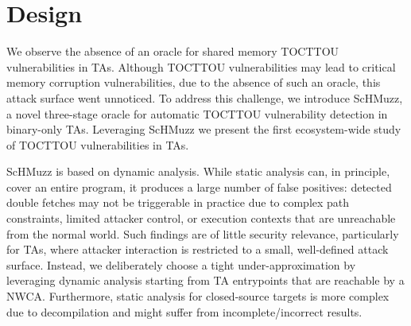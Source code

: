 \documentclass[letterpaper,twocolumn,10pt]{article}
\newcommand{\sysname}{ScHMuzz\xspace}
\begin{document}
\section{Design}\label{sec:design} 



We observe the absence of an oracle for shared memory TOCTTOU vulnerabilities in TAs.
Although TOCTTOU vulnerabilities may lead to critical memory corruption vulnerabilities, due to the 
absence of such an oracle, this attack surface went unnoticed.
To address this challenge, we introduce \sysname, a novel three-stage oracle  
for automatic TOCTTOU vulnerability detection in binary-only TAs. 
Leveraging \sysname we present the first ecosystem-wide study of TOCTTOU vulnerabilities in TAs.

\sysname is based on dynamic analysis. While static analysis 
can, in principle, cover an entire program, it produces a large number of false positives: detected double fetches 
may not be triggerable in practice due to complex path constraints, limited attacker control, or execution 
contexts that are unreachable from the normal world. Such findings are of little security relevance, 
particularly for TAs, where attacker interaction is restricted to a small, well-defined attack surface.
Instead, we deliberately choose a tight under-approximation by leveraging dynamic analysis starting from 
TA entrypoints that are reachable by a NWCA. Furthermore, static analysis for closed-source targets is more 
complex due to decompilation and might suffer from incomplete/incorrect results.
\end{document}
